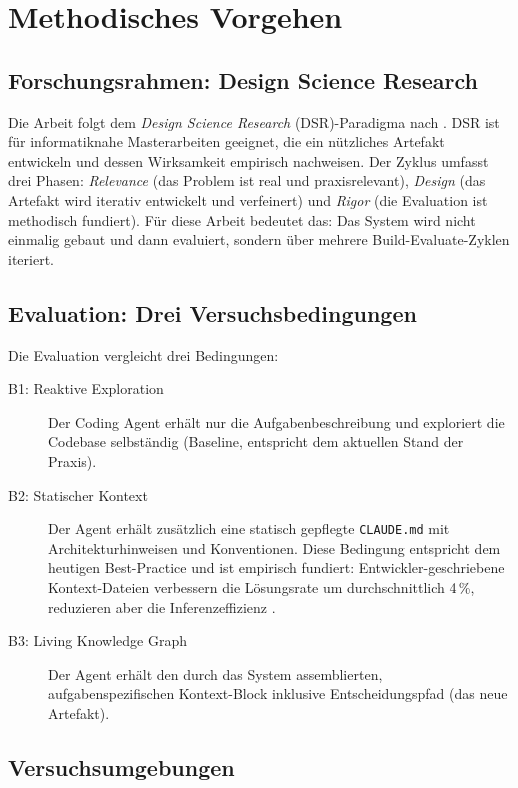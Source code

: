 \section{Methodisches Vorgehen}

\subsection*{Forschungsrahmen: Design Science Research}

Die Arbeit folgt dem \emph{Design Science Research} (DSR)-Paradigma nach \textcite{hevner2004dsr}. DSR ist für informatiknahe Masterarbeiten geeignet, die ein nützliches Artefakt entwickeln und dessen Wirksamkeit empirisch nachweisen. Der Zyklus umfasst drei Phasen: \emph{Relevance} (das Problem ist real und praxisrelevant), \emph{Design} (das Artefakt wird iterativ entwickelt und verfeinert) und \emph{Rigor} (die Evaluation ist methodisch fundiert). Für diese Arbeit bedeutet das: Das System wird nicht einmalig gebaut und dann evaluiert, sondern über mehrere Build-Evaluate-Zyklen iteriert.

\subsection*{Evaluation: Drei Versuchsbedingungen}

Die Evaluation vergleicht drei Bedingungen:

\begin{description}
  \item[B1: Reaktive Exploration] Der Coding Agent erhält nur die Aufgabenbeschreibung und exploriert die Codebase selbständig (Baseline, entspricht dem aktuellen Stand der Praxis).
  \item[B2: Statischer Kontext] Der Agent erhält zusätzlich eine statisch gepflegte \texttt{CLAUDE.md} mit Architekturhinweisen und Konventionen. Diese Bedingung entspricht dem heutigen Best-Practice und ist empirisch fundiert: Entwickler-geschriebene Kontext-Dateien verbessern die Lösungsrate um durchschnittlich 4\,\%, reduzieren aber die Inferenzeffizienz \parencite{gloaguen2026agentsmd,lulla2026agentsmd}.
  \item[B3: Living Knowledge Graph] Der Agent erhält den durch das System assemblierten, aufgabenspezifischen Kontext-Block inklusive Entscheidungspfad (das neue Artefakt).
\end{description}



\subsection*{Versuchsumgebungen}

